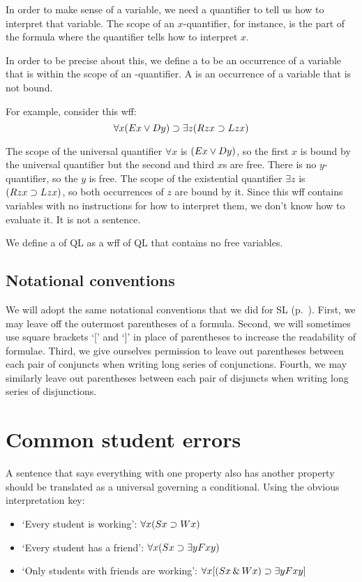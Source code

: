 In order to make sense of a variable, we need a quantifier to tell us how to interpret that variable. The scope of an $x$-quantifier, for instance, is the part of the formula where the quantifier tells how to interpret $x$.

In order to be precise about this, we define a  to be an occurrence of a variable  that is within the scope of an -quantifier. A  is an occurrence of a variable that is not bound.

For example, consider this wff: $$\forall x(Ex \vee Dy) \supset \exists z(Rzx \supset Lzx)$$ 

The scope of the universal quantifier $\forall x$ is $(Ex \vee Dy)$, so the first $x$ is bound by the universal quantifier but the second and third $x$s are free. There is no $y$-quantifier, so the $y$ is free. The scope of the existential quantifier $\exists z$ is $(Rzx \supset Lzx)$, so both occurrences of $z$ are bound by it. Since this wff contains variables with no instructions for how to interpret them, we don't know how to evaluate it. It is not a sentence.

We define a  of QL as a wff of QL that contains no free variables.

\subsection{Notational conventions}

We will adopt the same notational conventions that we did for SL (p.~\pageref{SLconventions}). First, we may leave off the outermost parentheses of a formula. Second, we will sometimes use square brackets `[' and `]' in place of parentheses to increase the readability of formulae. Third, we give ourselves permission to leave out parentheses between each pair of conjuncts when writing long series of conjunctions. Fourth, we may similarly leave out parentheses between each pair of disjuncts when writing long series of disjunctions.

\section{Common student errors}

A sentence that says everything with one property also has another property should be translated as a universal governing a conditional. Using the obvious interpretation key:

\begin{itemize}
\item `Every student is working': $\forall x (Sx \supset Wx)$
\item `Every student has a friend': $\forall x (Sx \supset \exists y Fxy)$
\item `Only students with friends are working': $\forall x [(Sx \,\&\, Wx) \supset \exists y Fxy]$
\end{itemize}

